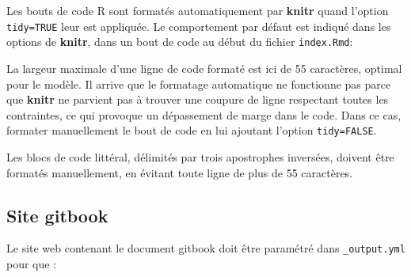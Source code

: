 \documentclass[
  12pt,
  french,
  a4paper,
  extrafontsizes,onecolumn,openright
  ]{memoir}
\newenvironment{Shaded}{\begin{snugshade}}{\end{snugshade}}
\newcommand{\CommentTok}[1]{\textcolor[rgb]{0.56,0.35,0.01}{\textit{#1}}}
\newcommand{\DataTypeTok}[1]{\textcolor[rgb]{0.13,0.29,0.53}{#1}}
\newcommand{\DecValTok}[1]{\textcolor[rgb]{0.00,0.00,0.81}{#1}}
\newcommand{\KeywordTok}[1]{\textcolor[rgb]{0.13,0.29,0.53}{\textbf{#1}}}
\newcommand{\NormalTok}[1]{#1}
\newcommand{\OperatorTok}[1]{\textcolor[rgb]{0.81,0.36,0.00}{\textbf{#1}}}
\newcommand{\OtherTok}[1]{\textcolor[rgb]{0.56,0.35,0.01}{#1}}
\newcommand{\StringTok}[1]{\textcolor[rgb]{0.31,0.60,0.02}{#1}}
\begin{document}
Les bouts de code R sont formatés automatiquement par \textbf{knitr} quand l'option \texttt{tidy=TRUE} leur est appliquée.
Le comportement par défaut est indiqué dans les options de \textbf{knitr}, dans un bout de code au début du fichier \texttt{index.Rmd}:

\scriptsize

\begin{Shaded}
\end{Shaded}

\normalsize

La largeur maximale d'une ligne de code formaté est ici de 55 caractères, optimal pour le modèle.
Il arrive que le formatage automatique ne fonctionne pas parce que \textbf{knitr} ne parvient pas à trouver une coupure de ligne respectant toutes les contraintes, ce qui provoque un dépassement de marge dans le code.
Dans ce cas, formater manuellement le bout de code en lui ajoutant l'option \texttt{tidy=FALSE}.

Les blocs de code littéral, délimités par trois apostrophes inversées, doivent être formatés manuellement, en évitant toute ligne de plus de 55 caractères.

\hypertarget{site-gitbook}{%
\subsection{Site gitbook}\label{site-gitbook}}

Le site web contenant le document gitbook doit être paramétré dans \texttt{\_output.yml} pour que :
\end{document}
